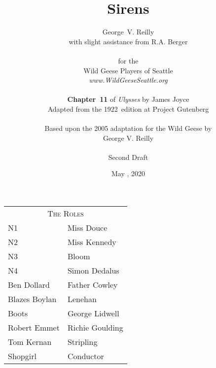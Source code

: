 


\title{\Huge Sirens}
\author{George~V. Reilly\\
{\small with slight assistance from R.A. Berger}\\
\\
{\small for the}\\
Wild Geese Players of Seattle\\
{\textit{www.WildGeeseSeattle.org}}\\
\\
{\small \textbf{Chapter~11} of \textit{Ulysses} by James Joyce}\\
{\small Adapted from the 1922~edition at Project Gutenberg}
\\
\\
{\small Based upon the 2005 adaptation for the Wild Geese by}\\
{\small George V. Reilly}\\
\\
{\small Second Draft}}
\date{May , 2020}
\raggedbottom



\maketitle
\thispagestyle{empty}
\pagebreak

\begin{tabular}{lp{10cm}}
    \multicolumn{2}{c}{\Large \textsc{The Roles}} \\
N1              & Miss Douce \\
N2              & Miss Kennedy \\
N3              & Bloom \\
N4              & Simon Dedalus \\
Ben Dollard     & Father Cowley \\
Blazes Boylan   & Lenehan \\
Boots           & George Lidwell \\
Robert Emmet    & Richie Goulding \\
Tom Kernan      & Stripling \\
Shopgirl        & Conductor \\
\end{tabular}

\bigskip

